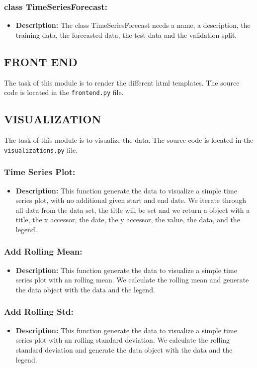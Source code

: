 \documentclass[11pt, a4paper]{article}
\begin{document}
\subsubsection*{class TimeSeriesForecast:}
\begin{itemize}
 \item[] \textbf{Description:} The class TimeSeriesForecast needs a name, a description, the training data, the forecasted data, the test data and the validation split.
\end{itemize}


\subsection{FRONT END}
The task of this module is to render the different html templates.
The source code is located in the \texttt{frontend.py} file.


\subsection{VISUALIZATION}
The task of this module is to visualize the data.
The source code is located in the \texttt{visualizations.py} file.

\subsubsection*{Time Series Plot:}
\begin{itemize}
 \item[] \textbf{Description:} This function generate the data to visualize a simple time series plot, with no additional given start and end date.
We iterate through all data from the data set, the title will be set and we return a object with a title, the x accessor, the date, the y accessor, the value,
the data, and the legend.
\end{itemize}


\subsubsection*{Add Rolling Mean:}
\begin{itemize}
 \item[] \textbf{Description:} This function generate the data to visualize a simple time series plot with an rolling mean. 
 We calculate the rolling mean and generate the data object with the data and the legend.
\end{itemize}


\subsubsection*{Add Rolling Std:}
\begin{itemize}
 \item[] \textbf{Description:} This function generate the data to visualize a simple time series plot with an rolling standard deviation. 
 We calculate the rolling standard deviation and generate the data object with the data and the legend.
\end{itemize}
\end{document}
